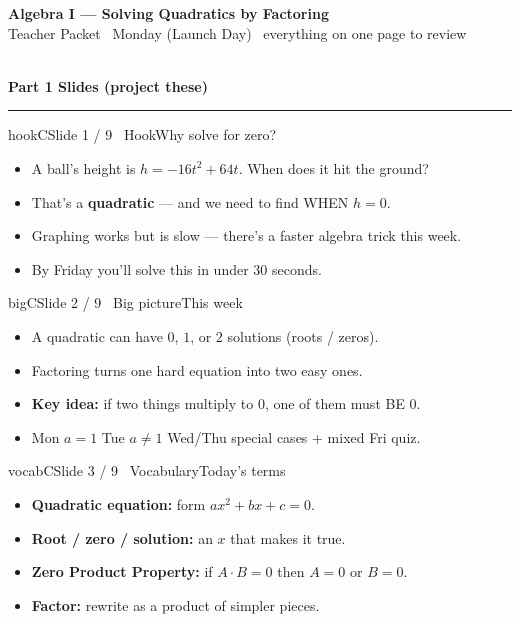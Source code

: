 \documentclass[11pt]{article}
\newcommand{\parthead}[1]{\vspace{6pt}{\color{bigC}\rule{\linewidth}{2pt}}\\[3pt]{\LARGE\bfseries\color{bigC!80!black} #1}\\[2pt]{\color{bigC}\rule{\linewidth}{2pt}}\vspace{6pt}}
\begin{document}
\begin{tcolorbox}[colback=bigC!85!black,colframe=bigC!85!black,coltext=white,boxrule=0pt,left=10pt,right=10pt]
{\LARGE\bfseries Algebra I --- Solving Quadratics by Factoring}\\[2pt]
{\normalsize Teacher Packet \textbullet\ Monday (Launch Day) \textbullet\ everything on one page to review}
\end{tcolorbox}

\parthead{Part 1 \; Slides (project these)}

\begin{slide}{hookC}{Slide 1 / 9 \textbullet\ Hook}{Why solve for zero?}
\begin{itemize}[leftmargin=1.3em,itemsep=1pt]
\item A ball's height is $h=-16t^{2}+64t$. When does it hit the ground?
\item That's a \textbf{quadratic} --- and we need to find WHEN $h=0$.
\item Graphing works but is slow --- there's a faster algebra trick this week.
\item By Friday you'll solve this in under 30 seconds.
\end{itemize}
\end{slide}

\begin{slide}{bigC}{Slide 2 / 9 \textbullet\ Big picture}{This week}
\begin{itemize}[leftmargin=1.3em,itemsep=1pt]
\item A quadratic can have $0$, $1$, or $2$ solutions (roots / zeros).
\item Factoring turns one hard equation into two easy ones.
\item \textbf{Key idea:} if two things multiply to $0$, one of them must BE $0$.
\item Mon $a{=}1$ \; Tue $a{\ne}1$ \; Wed/Thu special cases + mixed \; Fri quiz.
\end{itemize}
\end{slide}

\begin{slide}{vocabC}{Slide 3 / 9 \textbullet\ Vocabulary}{Today's terms}
\begin{itemize}[leftmargin=1.3em,itemsep=2pt]
\item \textbf{Quadratic equation:} form $ax^{2}+bx+c=0$.
\item \textbf{Root / zero / solution:} an $x$ that makes it true.
\item \textbf{Zero Product Property:} if $A\cdot B=0$ then $A=0$ or $B=0$.
\item \textbf{Factor:} rewrite as a product of simpler pieces.
\end{itemize}
\end{slide}
\end{document}
